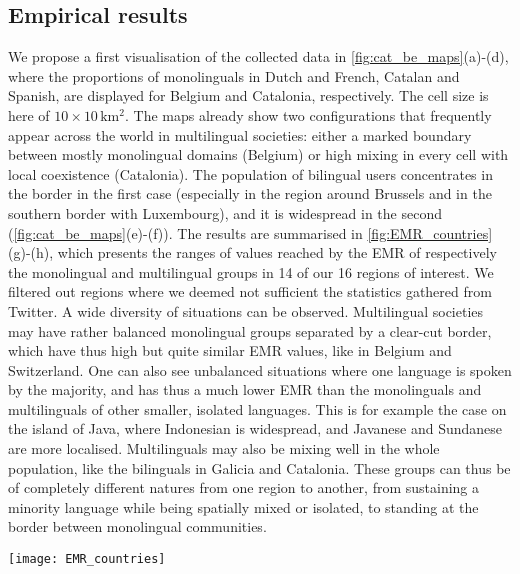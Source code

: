 \documentclass[../thesis.tex]{subfiles}
\begin{document}
\subsection{Empirical results}
We propose a first visualisation of the collected data in \cref{fig:cat_be_maps}(a)-(d),
where the proportions of monolinguals in Dutch and French, Catalan and Spanish, are
displayed for Belgium and Catalonia, respectively. The cell size is here of $10 \times
10 \, \si{\kilo \meter \squared}$. The maps already show two configurations that
frequently appear across the world in multilingual societies: either a marked boundary
between mostly monolingual domains (Belgium) or high mixing in every cell with local
coexistence (Catalonia). The population of bilingual users concentrates in the border in
the first case (especially in the region around Brussels and in the southern border with
Luxembourg), and it is widespread in the second (\cref{fig:cat_be_maps}(e)-(f)). The
results are summarised in \cref{fig:EMR_countries}(g)-(h), which presents the ranges of
values reached by the \ac{EMR} of respectively the monolingual and multilingual groups
in 14 of our 16 regions of interest. We filtered out regions where we deemed not
sufficient the statistics gathered from Twitter. A wide diversity of situations can be
observed. Multilingual societies may have rather balanced monolingual groups separated
by a clear-cut border, which have thus high but quite similar \ac{EMR} values, like in
Belgium and Switzerland. One can also see unbalanced situations where one language is
spoken by the majority, and has thus a much lower \ac{EMR} than the monolinguals and
multilinguals of other smaller, isolated languages. This is for example the case on the
island of Java, where Indonesian is widespread, and Javanese and Sundanese are more
localised. Multilinguals may also be mixing well in the whole population, like the
bilinguals in Galicia and Catalonia. These groups can thus be of completely different
natures from one region to another, from sustaining a minority language while being
spatially mixed or isolated, to standing at the border between monolingual communities.

\begin{figure*}[h!]
    \centering
    \texttt{[image: EMR\_countries]}
    \caption{\acp{EMR} of the (a) monolingual and (b) multilingual groups of
    multilingual regions of interest, ranked left to right by increasing average of the
    $y$-axis values. In (b), the point for trilinguals in Switzerland is not displayed
    because its value was deemed unreliable. A rich diversity of mixing patterns is
    shown, beyond the two paradigmatic cases of Catalonia and Belgium.}
    \label{fig:EMR_countries}
\end{figure*}
\end{document}
